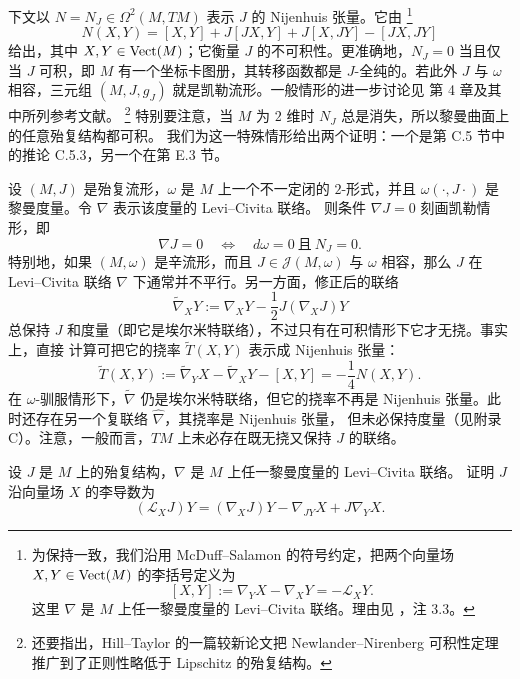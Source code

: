 下文以 $N=N_J\in\Omega^2(M,TM)$ 表示 $J$ 的 Nijenhuis 张量。它由
\footnote{为保持一致，我们沿用 McDuff--Salamon  的符号约定，把两个向量场
$X,Y\in\operatorname{Vect}(M)$ 的李括号定义为
\[
  [X,Y]:=\nabla_YX-\nabla_XY=-\mathcal L_XY.
\]
这里 $\nabla$ 是 $M$ 上任一黎曼度量的 Levi--Civita 联络。理由见
，注 3.3。}
\[
  N(X,Y)=[X,Y]+J[JX,Y]+J[X,JY]-[JX,JY]
\]
给出，其中 $X,Y\in\operatorname{Vect}(M)$；它衡量 $J$ 的不可积性。更准确地，$N_J=0$ 当且仅当
$J$ 可积，即 $M$ 有一个坐标卡图册，其转移函数都是 $J$-全纯的。若此外 $J$ 与
$\omega$ 相容，三元组 $(M,J,g_J)$ 就是凯勒流形。一般情形的进一步讨论见
 第 4 章及其中所列参考文献。
\footnote{还要指出，Hill--Taylor  的一篇较新论文把
Newlander--Nirenberg 可积性定理推广到了正则性略低于 Lipschitz 的殆复结构。}
特别要注意，当 $M$ 为 $2$ 维时 $N_J$ 总是消失，所以黎曼曲面上的任意殆复结构都可积。
我们为这一特殊情形给出两个证明：一个是第 C.5 节中的推论 C.5.3，另一个在第 E.3 节。

设 $(M,J)$ 是殆复流形，$\omega$ 是 $M$ 上一个不一定闭的 $2$-形式，并且
$\omega(\cdot,J\cdot)$ 是黎曼度量。令 $\nabla$ 表示该度量的 Levi--Civita 联络。
则条件 $\nabla J=0$ 刻画凯勒情形，即
\[
  \nabla J=0\quad\Longleftrightarrow\quad d\omega=0\ \text{且}\ N_J=0.
\]
特别地，如果 $(M,\omega)$ 是辛流形，而且 $J\in\mathcal J(M,\omega)$ 与 $\omega$
相容，那么 $J$ 在 Levi--Civita 联络 $\nabla$ 下通常并不平行。另一方面，修正后的联络
\[
  \widetilde\nabla_XY:=\nabla_XY-\frac12J(\nabla_XJ)Y
\]
总保持 $J$ 和度量（即它是埃尔米特联络），不过只有在可积情形下它才无挠。事实上，直接
计算可把它的挠率 $\widetilde T(X,Y)$ 表示成 Nijenhuis 张量：
\[
  \widetilde T(X,Y)
  :=\widetilde\nabla_YX-\widetilde\nabla_XY-[X,Y]
  =-\frac14N(X,Y).
\]
在 $\omega$-驯服情形下，$\widetilde\nabla$ 仍是埃尔米特联络，但它的挠率不再是
Nijenhuis 张量。此时还存在另一个复联络 $\widehat\nabla$，其挠率是 Nijenhuis 张量，
但未必保持度量（见附录 C）。注意，一般而言，$TM$ 上未必存在既无挠又保持 $J$ 的联络。

\begin{exercise}\label{ex:2-1-1}
设 $J$ 是 $M$ 上的殆复结构，$\nabla$ 是 $M$ 上任一黎曼度量的 Levi--Civita 联络。
证明 $J$ 沿向量场 $X$ 的李导数为
\[
  (\mathcal L_XJ)Y=(\nabla_XJ)Y-\nabla_{JY}X+J\nabla_YX.
\]
\end{exercise}
